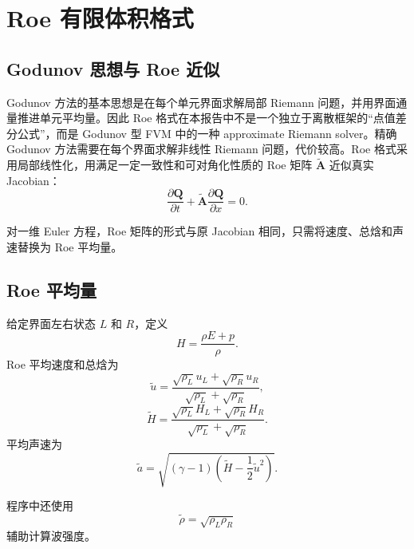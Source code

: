 \section{Roe 有限体积格式}

\subsection{Godunov 思想与 Roe 近似}

Godunov 方法的基本思想是在每个单元界面求解局部 Riemann 问题，并用界面通量推进单元平均量。因此 Roe 格式在本报告中不是一个独立于离散框架的“点值差分公式”，而是 Godunov 型 FVM 中的一种 approximate Riemann solver。精确 Godunov 方法需要在每个界面求解非线性 Riemann 问题，代价较高。Roe 格式采用局部线性化，用满足一定一致性和可对角化性质的 Roe 矩阵 \(\tilde{\bm A}\) 近似真实 Jacobian：
\begin{equation}
    \frac{\partial \bm Q}{\partial t}
    +
    \tilde{\bm A}
    \frac{\partial \bm Q}{\partial x}
    =
    0.
\end{equation}

对一维 Euler 方程，Roe 矩阵的形式与原 Jacobian 相同，只需将速度、总焓和声速替换为 Roe 平均量。

\subsection{Roe 平均量}

给定界面左右状态 \(L\) 和 \(R\)，定义
\begin{equation}
    H=\frac{\rho E+p}{\rho}.
\end{equation}
Roe 平均速度和总焓为
\begin{equation}
    \tilde u
    =
    \frac{\sqrt{\rho_L}u_L+\sqrt{\rho_R}u_R}
    {\sqrt{\rho_L}+\sqrt{\rho_R}},
\end{equation}
\begin{equation}
    \tilde H
    =
    \frac{\sqrt{\rho_L}H_L+\sqrt{\rho_R}H_R}
    {\sqrt{\rho_L}+\sqrt{\rho_R}}.
\end{equation}
平均声速为
\begin{equation}
    \tilde a
    =
    \sqrt{
        (\gamma-1)
        \left(
            \tilde H-\frac{1}{2}\tilde u^2
        \right)
    }.
\end{equation}

程序中还使用
\begin{equation}
    \tilde \rho = \sqrt{\rho_L\rho_R}
\end{equation}
辅助计算波强度。


